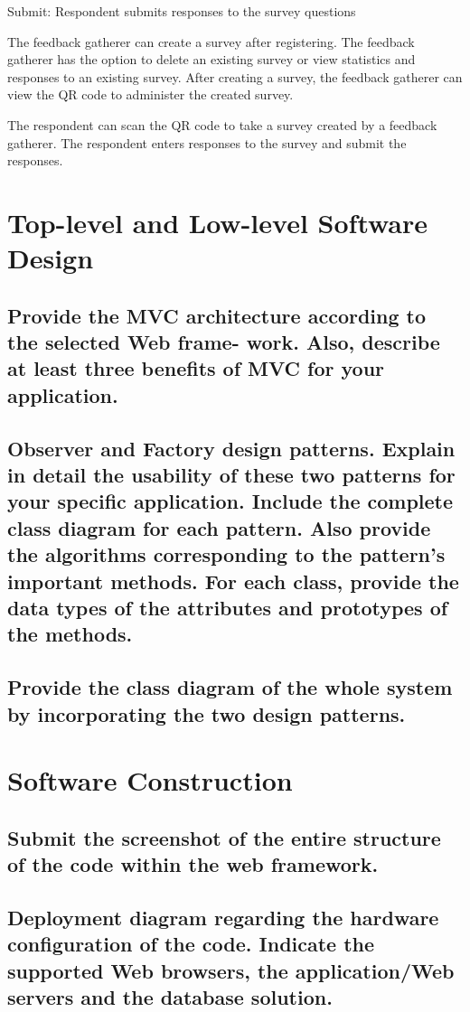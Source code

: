 \documentclass[letterpaper, 10 pt, conference]{ieeeconf}
\begin{document}
    Submit: Respondent submits responses to the survey questions

The feedback gatherer can create a survey after registering. The feedback gatherer has the option to delete an existing survey or view statistics and responses to an existing survey. After creating a survey, the feedback gatherer can view the QR code to administer the created survey.

The respondent can scan the QR code to take a survey created by a feedback gatherer. The respondent enters responses to the survey and submit the responses.

\section{Top-level and Low-level Software Design}
\subsection{Provide the MVC architecture according to the selected Web frame- work. Also, describe at least three benefits of MVC for your application.}
\subsection{Observer and Factory design patterns. Explain in detail the usability of these two patterns for your specific application. Include the complete class diagram for each pattern. Also provide the algorithms corresponding to the pattern’s important methods. For each class, provide the data types of the attributes and prototypes of the methods.}
\subsection{Provide the class diagram of the whole system by incorporating the two design patterns.
}

\section{Software Construction}
\subsection{Submit the screenshot of the entire structure of the code within the web framework.}
\subsection{Deployment diagram regarding the hardware configuration of the code. Indicate the supported Web browsers, the application/Web servers and the database solution.}
\end{document}
